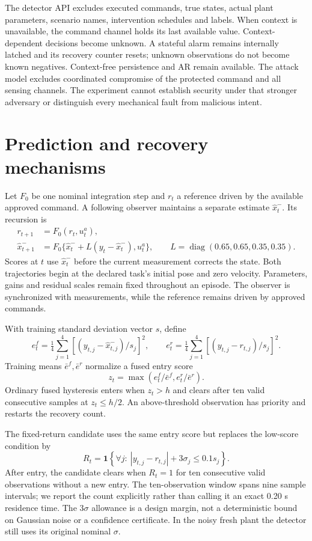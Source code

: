 The detector API excludes executed commands, true states, actual plant parameters, scenario names, intervention schedules and labels. When context is unavailable, the command channel holds its last available value. Context-dependent decisions become unknown. A stateful alarm remains internally latched and its recovery counter resets; unknown observations do not become known negatives. Context-free persistence and AR remain available. The attack model excludes coordinated compromise of the protected command and all sensing channels. The experiment cannot establish security under that stronger adversary or distinguish every mechanical fault from malicious intent.

\section{Prediction and recovery mechanisms}
Let $F_0$ be one nominal integration step and $r_t$ a reference driven by the available approved command. A following observer maintains a separate estimate $\hat x_t^-$. Its recursion is
\begin{align}
 r_{t+1}&=F_0(r_t,u_t^a),\\
 \hat x_{t+1}^-&=F_0\{\hat x_t^-+L(y_t-\hat x_t^-),u_t^a\},
 \qquad L=\operatorname{diag}(0.65,0.65,0.35,0.35).
\end{align}
Scores at $t$ use $\hat x_t^-$ before the current measurement corrects the state. Both trajectories begin at the declared task's initial pose and zero velocity. Parameters, gains and residual scales remain fixed throughout an episode. The observer is synchronized with measurements, while the reference remains driven by approved commands.

With training standard deviation vector $s$, define
\begin{equation}
 e_t^f=\tfrac14\sum_{j=1}^{4}[(y_{t,j}-\hat x^-_{t,j})/s_j]^2,
 \qquad
 e_t^r=\tfrac14\sum_{j=1}^{4}[(y_{t,j}-r_{t,j})/s_j]^2.
\end{equation}
Training means $\bar e^f,\bar e^r$ normalize a fused entry score
\begin{equation}
 z_t=\max(e_t^f/\bar e^f,e_t^r/\bar e^r).
\end{equation}
Ordinary fused hysteresis enters when $z_t>h$ and clears after ten valid consecutive samples at $z_t\le h/2$. An above-threshold observation has priority and restarts the recovery count. 

The fixed-return candidate uses the same entry score but replaces the low-score condition by
\begin{equation}\label{eq:return}
 R_t=\mathbf 1\!\left\{\forall j:\ |y_{t,j}-r_{t,j}|+3\sigma_j\le0.1s_j\right\}.
\end{equation}
After entry, the candidate clears when $R_t=1$ for ten consecutive valid observations without a new entry. The ten-observation window spans nine sample intervals; we report the count explicitly rather than calling it an exact 0.20 s residence time. The $3\sigma$ allowance is a design margin, not a deterministic bound on Gaussian noise or a confidence certificate. In the noisy fresh plant the detector still uses its original nominal $\sigma$.

